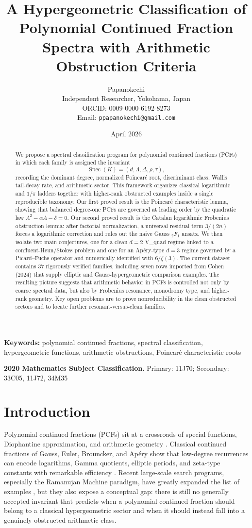 \documentclass[11pt]{article}
\title{A Hypergeometric Classification of Polynomial Continued Fraction Spectra with Arithmetic Obstruction Criteria}
\author{Papanokechi\\
\small Independent Researcher, Yokohama, Japan\\
\small ORCID: 0009-0000-6192-8273\\
\small Email: \texttt{ppapanokechi@gmail.com}}
\date{April 2026}
\begin{document}
\maketitle

\begin{abstract}
We propose a spectral classification program for polynomial continued fractions (PCFs) in which each family is assigned the invariant
\[
\operatorname{Spec}(K)=(d,\Lambda,\Delta,\rho,\tau),
\]
recording the dominant degree, normalized Poincar\'e root, discriminant class, Wallis tail-decay rate, and arithmetic sector. This framework organizes classical logarithmic and $1/\pi$ ladders together with higher-rank obstructed examples inside a single reproducible taxonomy. Our first proved result is the Poincar\'e characteristic lemma, showing that balanced degree-one PCFs are governed at leading order by the quadratic law $\Lambda^2-\alpha\Lambda-\delta=0$. Our second proved result is the Catalan logarithmic Frobenius obstruction lemma: after factorial normalization, a universal residual term $3/(2n)$ forces a logarithmic correction and rules out the naive Gauss ${}_2F_1$ ansatz. We then isolate two main conjectures, one for a clean $d=2$ V\_quad regime linked to a confluent-Heun/Stokes problem and one for an Ap\'ery-type $d=3$ regime governed by a Picard--Fuchs operator and numerically identified with $6/\zeta(3)$. The current dataset contains 37 rigorously verified families, including seven rows imported from Cohen (2024) that supply elliptic and Gauss-hypergeometric comparison examples. The resulting picture suggests that arithmetic behavior in PCFs is controlled not only by coarse spectral data, but also by Frobenius resonance, monodromy type, and higher-rank geometry. Key open problems are to prove nonreducibility in the clean obstructed sectors and to locate further resonant-versus-clean families.
\end{abstract}

\noindent\textbf{Keywords:} polynomial continued fractions, spectral classification, hypergeometric functions, arithmetic obstructions, Poincar\'e characteristic roots

\noindent\textbf{2020 Mathematics Subject Classification.}
Primary: 11J70;
Secondary: 33C05, 11J72, 34M35

\section{Introduction}
Polynomial continued fractions (PCFs) sit at a crossroads of special functions, Diophantine approximation, and arithmetic geometry \cite{wall1948,lorentzen2008}. Classical continued fractions of Gauss, Euler, Brouncker, and Ap\'ery show that low-degree recurrences can encode logarithms, Gamma quotients, elliptic periods, and zeta-type constants with remarkable efficiency \cite{apery1979}. Recent large-scale search programs, especially the Ramanujan Machine paradigm, have greatly expanded the list of examples \cite{raayoni2021}, but they also expose a conceptual gap: there is still no generally accepted invariant that predicts when a polynomial continued fraction should belong to a classical hypergeometric sector and when it should instead fall into a genuinely obstructed arithmetic class.
\end{document}
